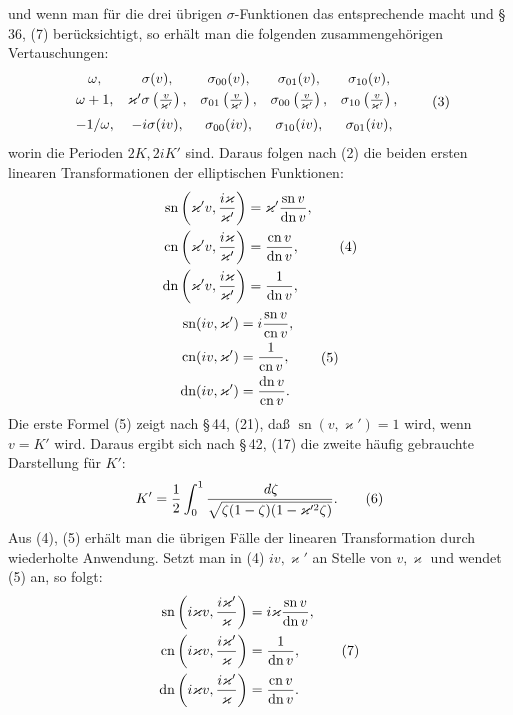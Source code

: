 \documentclass[11pt]{article}
\providecommand{\dd}{\,d}
\providecommand{\sn}{\operatorname{sn}}
\providecommand{\cn}{\operatorname{cn}}
\providecommand{\dn}{\operatorname{dn}}
\begin{document}
und wenn man für die drei übrigen $\sigma$-Funktionen das entsprechende macht und \S\,36, (7) berücksichtigt, so erhält man die folgenden zusammengehörigen Vertauschungen:
\begin{equation}
\begin{array}{ccccc}
\omega,& \sigma(v),&\sigma_{00}(v),&\sigma_{01}(v),&\sigma_{10}(v),\\[0.3em]
\omega+1,&\varkappa'\sigma\left({v\over\varkappa'}\right),&
\sigma_{01}\left({v\over\varkappa'}\right),&
\sigma_{00}\left({v\over\varkappa'}\right),&
\sigma_{10}\left({v\over\varkappa'}\right),\\[0.6em]
-1/\omega,&-i\sigma(iv),&\sigma_{00}(iv),&\sigma_{10}(iv),&\sigma_{01}(iv),
\end{array}
\tag{3}
\end{equation}
worin die Perioden $2K,2iK'$ sind. Daraus folgen nach (2) die beiden ersten linearen Transformationen der elliptischen Funktionen:
\begin{equation}
\begin{aligned}
\sn\left(\varkappa'v,{i\varkappa\over\varkappa'}\right)&=\varkappa'{\sn v\over\dn v},\\
\cn\left(\varkappa'v,{i\varkappa\over\varkappa'}\right)&={\cn v\over\dn v},\\
\dn\left(\varkappa'v,{i\varkappa\over\varkappa'}\right)&={1\over\dn v},
\end{aligned}
\tag{4}
\end{equation}
\begin{equation}
\begin{aligned}
\sn(iv,\varkappa')&=i{\sn v\over\cn v},\\
\cn(iv,\varkappa')&={1\over\cn v},\\
\dn(iv,\varkappa')&={\dn v\over\cn v}.
\end{aligned}
\tag{5}
\end{equation}
Die erste Formel (5) zeigt nach \S\,44, (21), daß $\sn(v,\varkappa')=1$ wird, wenn $v=K'$ wird. Daraus ergibt sich nach \S\,42, (17) die zweite häufig gebrauchte Darstellung für $K'$:
\begin{equation}
K'={1\over2}\int_0^1 {\dd\zeta\over\sqrt{\zeta(1-\zeta)(1-\varkappa'^2\zeta)}}.
\tag{6}
\end{equation}
Aus (4), (5) erhält man die übrigen Fälle der linearen Transformation durch wiederholte Anwendung. Setzt man in (4) $iv,\varkappa'$ an Stelle von $v,\varkappa$ und wendet (5) an, so folgt:
\begin{equation}
\begin{aligned}
\sn\left(i\varkappa v,{i\varkappa'\over\varkappa}\right)&=i\varkappa{\sn v\over\dn v},\\
\cn\left(i\varkappa v,{i\varkappa'\over\varkappa}\right)&={1\over\dn v},\\
\dn\left(i\varkappa v,{i\varkappa'\over\varkappa}\right)&={\cn v\over\dn v}.
\end{aligned}
\tag{7}
\end{equation}
\end{document}
